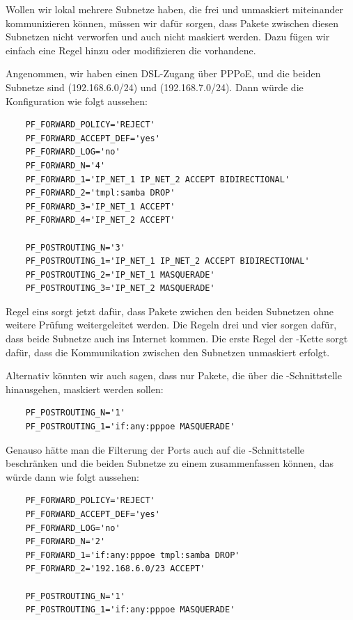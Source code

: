 Wollen wir lokal mehrere Subnetze haben, die frei und unmaskiert
miteinander kommunizieren können, müssen wir dafür sorgen, dass Pakete
zwischen diesen Subnetzen nicht verworfen und auch nicht maskiert
werden. Dazu fügen wir einfach eine Regel hinzu oder modifizieren die vorhandene.

Angenommen, wir haben einen DSL-Zugang über PPPoE, und die beiden Subnetze sind
 (192.168.6.0/24) und  (192.168.7.0/24).
Dann würde die Konfiguration wie folgt aussehen:

\begin{example}
\begin{verbatim}
    PF_FORWARD_POLICY='REJECT'
    PF_FORWARD_ACCEPT_DEF='yes'
    PF_FORWARD_LOG='no'
    PF_FORWARD_N='4'
    PF_FORWARD_1='IP_NET_1 IP_NET_2 ACCEPT BIDIRECTIONAL'
    PF_FORWARD_2='tmpl:samba DROP'
    PF_FORWARD_3='IP_NET_1 ACCEPT'
    PF_FORWARD_4='IP_NET_2 ACCEPT'

    PF_POSTROUTING_N='3'
    PF_POSTROUTING_1='IP_NET_1 IP_NET_2 ACCEPT BIDIRECTIONAL'
    PF_POSTROUTING_2='IP_NET_1 MASQUERADE'
    PF_POSTROUTING_3='IP_NET_2 MASQUERADE'
\end{verbatim}
\end{example}

Regel eins sorgt jetzt dafür, dass Pakete zwichen den beiden
Subnetzen ohne weitere Prüfung weitergeleitet werden. Die Regeln drei und vier
sorgen dafür, dass beide Subnetze auch ins Internet kommen. Die erste Regel
der -Kette sorgt dafür, dass die Kommunikation zwischen
den Subnetzen unmaskiert erfolgt.

Alternativ könnten wir auch sagen, dass nur Pakete, die über die
-Schnittstelle hinausgehen, maskiert werden sollen:

\begin{example}
\begin{verbatim}
    PF_POSTROUTING_N='1'
    PF_POSTROUTING_1='if:any:pppoe MASQUERADE'
\end{verbatim}
\end{example}

Genauso hätte man die Filterung der Ports auch auf die
-Schnittstelle beschränken und die beiden Subnetze zu einem
zusammenfassen können, das würde dann wie folgt aussehen:

\begin{example}
\begin{verbatim}
    PF_FORWARD_POLICY='REJECT'
    PF_FORWARD_ACCEPT_DEF='yes'
    PF_FORWARD_LOG='no'
    PF_FORWARD_N='2'
    PF_FORWARD_1='if:any:pppoe tmpl:samba DROP'
    PF_FORWARD_2='192.168.6.0/23 ACCEPT'

    PF_POSTROUTING_N='1'
    PF_POSTROUTING_1='if:any:pppoe MASQUERADE'
\end{verbatim}
\end{example}

